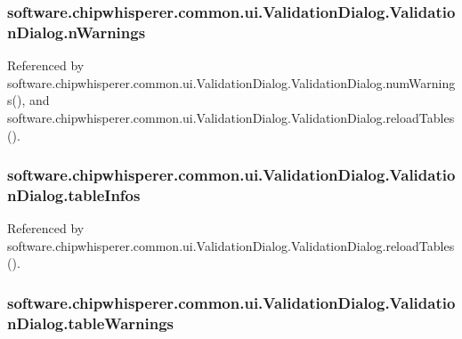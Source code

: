 \subsubsection[{n\+Warnings}]{\setlength{\rightskip}{0pt plus 5cm}software.\+chipwhisperer.\+common.\+ui.\+Validation\+Dialog.\+Validation\+Dialog.\+n\+Warnings}\label{classsoftware_1_1chipwhisperer_1_1common_1_1ui_1_1ValidationDialog_1_1ValidationDialog_aa66403c4b375c4e56a8220c4a750be20}


Referenced by software.\+chipwhisperer.\+common.\+ui.\+Validation\+Dialog.\+Validation\+Dialog.\+num\+Warnings(), and software.\+chipwhisperer.\+common.\+ui.\+Validation\+Dialog.\+Validation\+Dialog.\+reload\+Tables().

\hypertarget{classsoftware_1_1chipwhisperer_1_1common_1_1ui_1_1ValidationDialog_1_1ValidationDialog_a1b95a93215b90d97b977c59cbb371856}{}
\subsubsection[{table\+Infos}]{\setlength{\rightskip}{0pt plus 5cm}software.\+chipwhisperer.\+common.\+ui.\+Validation\+Dialog.\+Validation\+Dialog.\+table\+Infos}\label{classsoftware_1_1chipwhisperer_1_1common_1_1ui_1_1ValidationDialog_1_1ValidationDialog_a1b95a93215b90d97b977c59cbb371856}


Referenced by software.\+chipwhisperer.\+common.\+ui.\+Validation\+Dialog.\+Validation\+Dialog.\+reload\+Tables().

\hypertarget{classsoftware_1_1chipwhisperer_1_1common_1_1ui_1_1ValidationDialog_1_1ValidationDialog_a3f6ce8711d336349a1969276ba025951}{}
\subsubsection[{table\+Warnings}]{\setlength{\rightskip}{0pt plus 5cm}software.\+chipwhisperer.\+common.\+ui.\+Validation\+Dialog.\+Validation\+Dialog.\+table\+Warnings}\label{classsoftware_1_1chipwhisperer_1_1common_1_1ui_1_1ValidationDialog_1_1ValidationDialog_a3f6ce8711d336349a1969276ba025951}


